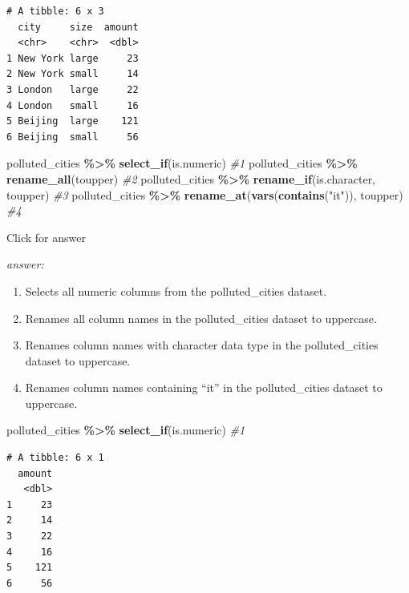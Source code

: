 \documentclass[
]{book}
\newenvironment{Shaded}{\begin{snugshade}}{\end{snugshade}}
\newcommand{\CommentTok}[1]{\textcolor[rgb]{0.56,0.35,0.01}{\textit{#1}}}
\newcommand{\FunctionTok}[1]{\textcolor[rgb]{0.13,0.29,0.53}{\textbf{#1}}}
\newcommand{\NormalTok}[1]{#1}
\newcommand{\SpecialCharTok}[1]{\textcolor[rgb]{0.81,0.36,0.00}{\textbf{#1}}}
\newcommand{\StringTok}[1]{\textcolor[rgb]{0.31,0.60,0.02}{#1}}
\providecommand{\tightlist}{%
  \setlength{\itemsep}{0pt}\setlength{\parskip}{0pt}}
\begin{document}
\begin{verbatim}
# A tibble: 6 x 3
  city     size  amount
  <chr>    <chr>  <dbl>
1 New York large     23
2 New York small     14
3 London   large     22
4 London   small     16
5 Beijing  large    121
6 Beijing  small     56
\end{verbatim}

\begin{Shaded}
\begin{Highlighting}[]
\NormalTok{polluted\_cities }\SpecialCharTok{\%\textgreater{}\%} \FunctionTok{select\_if}\NormalTok{(is.numeric) }\CommentTok{\#1}
\NormalTok{polluted\_cities }\SpecialCharTok{\%\textgreater{}\%} \FunctionTok{rename\_all}\NormalTok{(toupper) }\CommentTok{\#2}
\NormalTok{polluted\_cities }\SpecialCharTok{\%\textgreater{}\%} \FunctionTok{rename\_if}\NormalTok{(is.character, toupper) }\CommentTok{\#3}
\NormalTok{polluted\_cities }\SpecialCharTok{\%\textgreater{}\%} \FunctionTok{rename\_at}\NormalTok{(}\FunctionTok{vars}\NormalTok{(}\FunctionTok{contains}\NormalTok{(}\StringTok{"it"}\NormalTok{)), toupper) }\CommentTok{\#4}
\end{Highlighting}
\end{Shaded}

Click for answer

\emph{answer:}

\begin{enumerate}
\def\labelenumi{\arabic{enumi}.}
\tightlist
\item
  Selects all numeric columns from the polluted\_cities dataset.
\item
  Renames all column names in the polluted\_cities dataset to uppercase.
\item
  Renames column names with character data type in the polluted\_cities dataset to uppercase.
\item
  Renames column names containing ``it'' in the polluted\_cities dataset to uppercase.
\end{enumerate}

\begin{Shaded}
\begin{Highlighting}[]
\NormalTok{polluted\_cities }\SpecialCharTok{\%\textgreater{}\%} \FunctionTok{select\_if}\NormalTok{(is.numeric) }\CommentTok{\#1}
\end{Highlighting}
\end{Shaded}

\begin{verbatim}
# A tibble: 6 x 1
  amount
   <dbl>
1     23
2     14
3     22
4     16
5    121
6     56
\end{verbatim}
\end{document}
